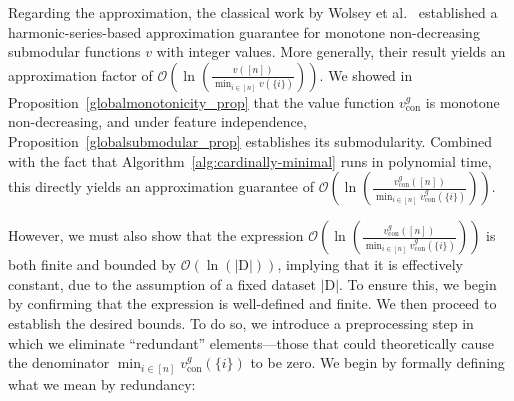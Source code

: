 \documentclass{article}
\begin{document}
Regarding the approximation, the classical work by Wolsey et al.~\citep{wolsey1982analysis} established a harmonic-series-based approximation guarantee for monotone non-decreasing submodular functions $v$ with integer values. More generally, their result yields an approximation factor of $\mathcal{O}\left(\ln\left(\frac{v([n])}{\min_{i \in [n]} v(\{i\})}\right)\right)$. We showed in Proposition~\ref{globalmonotonicity_prop} that the value function $v^g_{\text{con}}$ is monotone non-decreasing, and under feature independence, Proposition~\ref{globalsubmodular_prop} establishes its submodularity. Combined with the fact that Algorithm~\ref{alg:cardinally-minimal} runs in polynomial time, this directly yields an approximation guarantee of $\mathcal{O}\left(\ln\left(\frac{v^g_{\text{con}}([n])}{\min_{i \in [n]} v^g_{\text{con}}(\{i\})}\right)\right)$.





However, we must also show that the expression $\mathcal{O}\left(\ln\left(\frac{v^g_{\text{con}}([n])}{\min_{i \in [n]} v^g_{\text{con}}(\{i\})}\right)\right)$ is both finite and bounded by $\mathcal{O}(\ln(|\text{D}|))$, implying that it is effectively constant, due to the assumption of a fixed dataset $|\text{D}|$. To ensure this, we begin by confirming that the expression is well-defined and finite. We then proceed to establish the desired bounds. To do so, we introduce a preprocessing step in which we eliminate ``redundant'' elements—those that could theoretically cause the denominator $\min_{i \in [n]} v^g_{\text{con}}(\{i\})$ to be zero. We begin by formally defining what we mean by redundancy:
\end{document}
